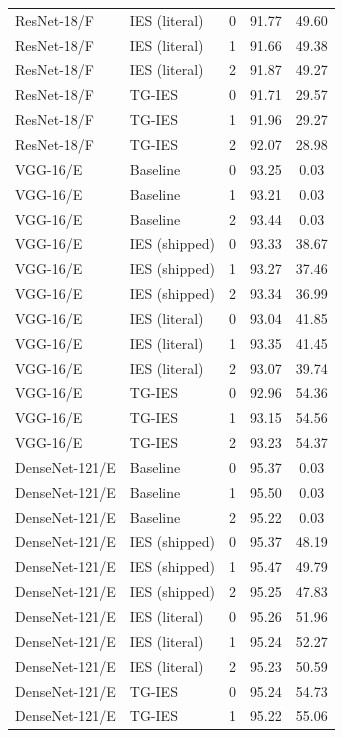 \documentclass{article}
\newcommand{\win}[1]{\cellcolor{tgwin}#1}
\newcommand{\lose}[1]{\cellcolor{tglose}#1}
\theoremstyle{plain}
\theoremstyle{definition}
\theoremstyle{remark}
\begin{document}
\begin{longtable}{llccc}
ResNet-18/F & IES (literal) & 0 & 91.77 & 49.60 \\
ResNet-18/F & IES (literal) & 1 & 91.66 & 49.38 \\
ResNet-18/F & IES (literal) & 2 & 91.87 & 49.27 \\
ResNet-18/F & TG-IES & 0 & \lose{91.71} & \lose{29.57} \\
ResNet-18/F & TG-IES & 1 & \lose{91.96} & \lose{29.27} \\
ResNet-18/F & TG-IES & 2 & \lose{92.07} & \lose{28.98} \\
VGG-16/E & Baseline & 0 & 93.25 & 0.03 \\
VGG-16/E & Baseline & 1 & 93.21 & 0.03 \\
VGG-16/E & Baseline & 2 & 93.44 & 0.03 \\
VGG-16/E & IES (shipped) & 0 & 93.33 & 38.67 \\
VGG-16/E & IES (shipped) & 1 & 93.27 & 37.46 \\
VGG-16/E & IES (shipped) & 2 & 93.34 & 36.99 \\
VGG-16/E & IES (literal) & 0 & 93.04 & 41.85 \\
VGG-16/E & IES (literal) & 1 & 93.35 & 41.45 \\
VGG-16/E & IES (literal) & 2 & 93.07 & 39.74 \\
VGG-16/E & TG-IES & 0 & \lose{92.96} & \win{54.36} \\
VGG-16/E & TG-IES & 1 & \lose{93.15} & \win{54.56} \\
VGG-16/E & TG-IES & 2 & \lose{93.23} & \win{54.37} \\
DenseNet-121/E & Baseline & 0 & 95.37 & 0.03 \\
DenseNet-121/E & Baseline & 1 & 95.50 & 0.03 \\
DenseNet-121/E & Baseline & 2 & 95.22 & 0.03 \\
DenseNet-121/E & IES (shipped) & 0 & 95.37 & 48.19 \\
DenseNet-121/E & IES (shipped) & 1 & 95.47 & 49.79 \\
DenseNet-121/E & IES (shipped) & 2 & 95.25 & 47.83 \\
DenseNet-121/E & IES (literal) & 0 & 95.26 & 51.96 \\
DenseNet-121/E & IES (literal) & 1 & 95.24 & 52.27 \\
DenseNet-121/E & IES (literal) & 2 & 95.23 & 50.59 \\
DenseNet-121/E & TG-IES & 0 & \lose{95.24} & \win{54.73} \\
DenseNet-121/E & TG-IES & 1 & \lose{95.22} & \win{55.06} \\

\end{longtable}
\end{document}
